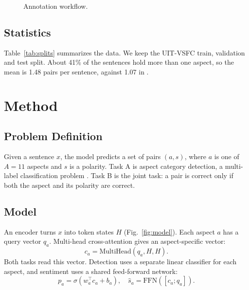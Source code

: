 \documentclass[9pt, conference, a4paper, compsocconf]{IEEEtran}
\begin{document}
\begin{figure}[!t]
\centering
{}
\caption{Annotation workflow.}
\label{fig:workflow}
\end{figure}

\subsection{Statistics}
Table~\ref{tab:splits} summarizes the data. We keep the UIT-VSFC train, validation and test split. About 41\% of the sentences hold more than one aspect, so the mean is 1.48 pairs per sentence, against 1.07 in \cite{sau2021absa}.

\begin{table}[!t]
\renewcommand{\arraystretch}{1.1}
\caption{\uppercase{Dataset splits}}
\label{tab:splits}
\centering

\end{table}

\section{Method}
\subsection{Problem Definition}
Given a sentence $x$, the model predicts a set of pairs $(a, s)$, where $a$ is one of $A = 11$ aspects and $s$ is a polarity. Task A is aspect category detection, a multi-label classification problem \cite{tsoumakas2007multilabel}. Task B is the joint task: a pair is correct only if both the aspect and its polarity are correct.

\subsection{Model}
An encoder turns $x$ into token states $H$ (Fig.~\ref{fig:model}). Each aspect $a$ has a query vector $q_a$. Multi-head cross-attention gives an aspect-specific vector:
\begin{equation}
c_a = \mathrm{MultiHead}(q_a, H, H).
\end{equation}
Both tasks read this vector. Detection uses a separate linear classifier for each aspect, and sentiment uses a shared feed-forward network:
\begin{equation}
p_a = \sigma(w_a^\top c_a + b_a), \quad \hat{s}_a = \mathrm{FFN}([c_a; q_a]).
\end{equation}
\end{document}
